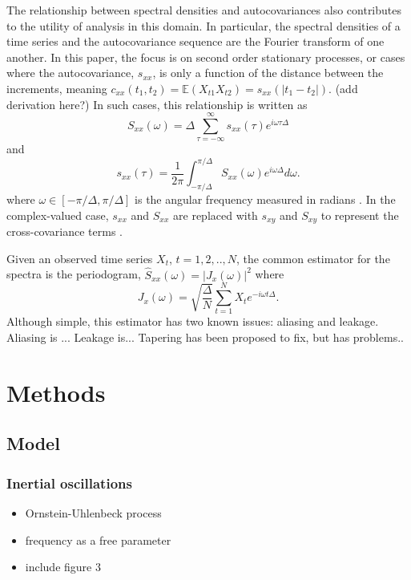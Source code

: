 \documentclass{stat572Style}
\begin{document}
The relationship between spectral densities and autocovariances also contributes to the utility of analysis in this domain. In particular, the spectral densities of a time series and the autocovariance sequence are the Fourier transform of one another.  In this paper, the focus is on second order stationary processes,  or cases where the autocovariance, $s_{xx}$, is only a function of the distance between the increments,  meaning $c_{xx}(t_{1}, t_{2}) = \mathbb{E}(X_{t1}X_{t2}) = s_{xx}(|t_{1} - t_{2}|)$.  (add derivation here?) In such cases, this relationship is written as 
	\begin{equation}
	S_{xx}(\omega) = \Delta \sum_{\tau = -\infty}^{\infty} s_{xx}(\tau)e^{i\omega \tau \Delta} 
	\end{equation}
and 
	\begin{equation}
		s_{xx}(\tau) = \frac{1}{2\pi} \int_{-\pi / \Delta}^{\pi / \Delta}S_{xx}(\omega)e^{i \omega \Delta}d \omega.
	\end{equation}
\noindent where $\omega \in [-\pi/\Delta, \pi/ \Delta]$ is the angular frequency measured in radians \citep{Sykulski2013}
.  In the complex-valued case, $s_{xx}$ and $S_{xx}$ are replaced with $s_{xy}$ and $S_{xy}$ to represent the cross-covariance terms \citep{Sykulski2013}. 

Given an observed time series $X_{t}$, $t = 1,2,..,N$, the common estimator for the spectra is the periodogram, $\hat{S}_{xx}(\omega) = |J_{x}(\omega)|^{2}$ where 
\begin{equation}
J_{x}(\omega) = \sqrt{\frac{\Delta}{N}} \sum_{t=1}^{N} X_{t}e^{-i \omega t \Delta}. 
\end{equation}
Although simple, this estimator has two known issues: aliasing and leakage.  Aliasing is ... Leakage is... Tapering has been proposed to fix, but has problems.. 


\section{Methods}

	\subsection{Model}
		\subsubsection{Inertial oscillations}
			\begin{itemize}
				\item Ornstein-Uhlenbeck process 
				\item frequency as a free parameter
				\item include figure 3 
			\end{itemize}
		
\end{document}
